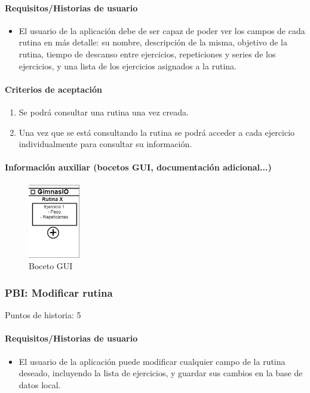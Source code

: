 \documentclass[11pt,a4paper]{report}
\begin{document}
\paragraph{Requisitos/Historias de usuario}
\begin{itemize}
	\item El usuario de la aplicación debe de ser capaz de poder ver los campos de cada rutina en más detalle: su nombre, descripción de la misma, objetivo de la rutina, tiempo de descanso entre ejercicios, repeticiones y series de los ejercicios, y una lista de los ejercicios asignados a la rutina.
\end{itemize}
\paragraph{Criterios de aceptación}
\begin{enumerate}
	\item Se podrá consultar una rutina una vez creada.
	\item Una vez que se está consultando la rutina se podrá acceder a cada ejercicio individualmente para consultar su información.
\end{enumerate}
\paragraph{Información auxiliar (bocetos GUI, documentación adicional...)}
\begin{figure}[H]
	\centering
	\includegraphics[width=0.2\textwidth]{capturicas/guipbiverrutina.png}
	\caption{Boceto GUI}
	\label{fig: guipbi5}
\end{figure}
\subsubsection{PBI: Modificar rutina}
Puntos de historia: 5	
\paragraph{Requisitos/Historias de usuario}
\begin{itemize}
	\item El usuario de la aplicación puede modificar cualquier campo de la rutina deseado, incluyendo la lista de ejercicios, y guardar sus cambios  en la base de datos local.
\end{itemize}
\end{document}
